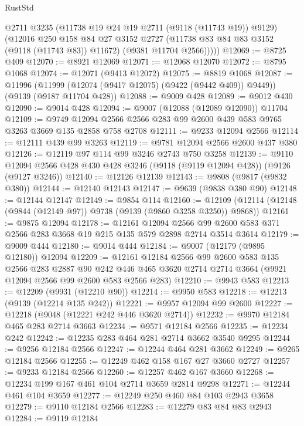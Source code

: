 \begin{lexlean}{RustStd}
\begin{coremodule}
          @2711
          @3235
          (@11738 @19 @24 @19 @2711 (@9118 (@11743 @19)) @9129)
          (@12016
            @250
            @158
            @84
            @27
            @3152
            @2727
            (@11738 @83 @84 @83 @3152 (@9118 (@11743 @83)) @11672)
            (@9381 @11704 @2566)))))
@12069 := @8725 @409
@12070 := @8921 @12069
@12071 := @12068 @12070
@12072 := @8795 @1068
@12074 := @12071 (@9413 @12072)
@12075 := @8819 @1068
@12087 := @11996
    (@11999 (@12074 (@9417 @12075) (@9422 (@9442 @409)) @9449))
    (@9139 (@9187 @11704 @428))
@12088 := @9009 @428
@12089 := @9012 @430
@12090 := @9014 @428
@12094 := @9007 (@12088 (@12089 @12090)) @11704
@12109 := @9749 @12094 @2566 @2566 @283 @99 @2600 @439 @583 @9765 @3263 @3669 @135 @2858 @758 @2708
@12111 := @9233 @12094 @2566
@12114 := @12111 @439 @99 @3263
@12119 := @9781 @12094 @2566 @2600 @437 @380
@12126 := @12119 @97 @114 @99 @3246 @2743 @750 @3258
@12139 := @9110 @12094 @2566 @428 @430 @428 @3246 (@9118 (@9119 @12094 @428)) (@9126 (@9127 @3246))
@12140 := @12126 @12139
@12143 := @9808 (@9817 (@9832 @380))
@12144 := @12140 @12143
@12147 := @9639 (@9838 @380 @90)
@12148 := @12144 @12147
@12149 := @9854 @114
@12160 := @12109 (@12114 (@12148 (@9844 (@12149 @97)) @9738 (@9139 (@9860 @3258 @3250)) @9868))
@12161 := @9875 @12094
@12178 := @12161
    @12094
    @2566
    @99
    @2600
    @583
    @371
    @2566
    @283
    @3668
    @19
    @215
    @135
    @579
    @2898
    @2714
    @3514
    @3614
@12179 := @9009 @444
@12180 := @9014 @444
@12184 := @9007 (@12179 (@9895 @12180)) @12094
@12209 := @12161
    @12184
    @2566
    @99
    @2600
    @583
    @135
    @2566
    @283
    @2887
    @90
    @242
    @446
    @465
    @3620
    @2714
    @2714
    @3664
    (@9921 @12094 @2566 @99 @2600 @583 @2566 @283)
@12210 := @9943 @583
@12213 := @12209 (@9931 (@12210 @90))
@12214 := @9950 @583
@12218 := @12213 (@9139 (@12214 @135 @242))
@12221 := @9957 @12094 @99 @2600
@12227 := @12218 (@9048 (@12221 @242 @446 @3620 @2714))
@12232 := @9970 @12184 @465 @283 @2714 @3663
@12234 := @9571 @12184 @2566
@12235 := @12234 @242
@12242 := @12235 @283 @464 @281 @2714 @3662 @3540 @9295
@12244 := @9256 @12184 @2566
@12247 := @12244 @464 @281 @3662
@12249 := @9265 @12184 @2566
@12255 := @12249 @462 @158 @167 @27 @3660 @2727
@12257 := @9233 @12184 @2566
@12260 := @12257 @462 @167 @3660
@12268 := @12234 @199 @167 @461 @104 @2714 @3659 @2814 @9298
@12271 := @12244 @461 @104 @3659
@12277 := @12249 @250 @460 @84 @103 @2943 @3658
@12279 := @9110 @12184 @2566
@12283 := @12279 @83 @84 @83 @2943
@12284 := @9119 @12184

\end{coremodule}
\end{lexlean}

